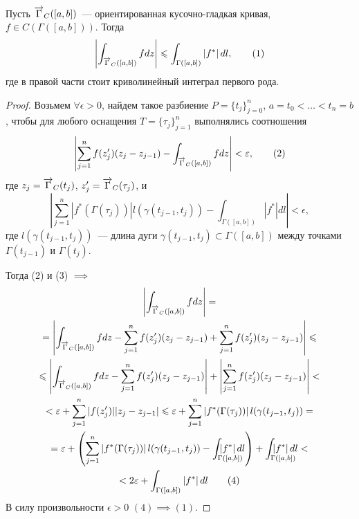 \documentclass[main]{subfiles}
\begin{document}
\begin{property} \label{1:LessThanLength}
    Пусть $\AnClOrCurve_C([a,b])$~--- ориентированная кусочно-гладкая кривая, $f \in C(\Gamma([a,b]))$.
    Тогда
    \[\left| \AnClOrInt[\AnClOrCurve_C ([a,b])] f dz \right| \le \int_{\Gamma([a,b])} \left| f^* \right| dl, \tag{1}\]
    где в правой части стоит криволинейный интеграл первого рода.
\end{property}
\begin{proof}
    Возьмем $\forall \epsilon >0$, найдем такое разбиение $P = \{t_j\}_{j=0}^n$, $a=t_0 < \dotsc < t_n = b$, чтобы для любого оснащения $T = \{\tau_j\}_{j=1}^n$ выполнялись соотношения
    \[\left| \sum_{j=1}^{n} f(z_j') (z_j - z_{j-1}) - \AnClOrInt[\AnClOrCurve_C ([a,b])] f dz \right| < \epsilon, \tag{2}\]
    где $z_j = \AnClOrCurve_C (t_j)$, $z_j' = \AnClOrCurve_C(\tau_j)$, и
    \[\left| \sum_{j=1}^{n} \left| f^*(\Gamma(\tau_j)) \right| l(\gamma(t_{j-1}, t_j)) - \int_{\Gamma([a,b])} \left| f^* \right| dl \right| < \epsilon, \tag{3}\]
    где $l(\gamma(t_{j-1}, t_j))$~--- длина дуги $\gamma(t_{j-1}, t_j) \subset \Gamma([a,b])$ между точками $\Gamma(t_{j-1})$ и $\Gamma(t_j)$.

    Тогда (2) и (3) $\implies$
    \begin{multline*}
        \left| \AnClOrInt[\AnClOrCurve_C ([a,b])] f dz \right| = \\
        = \left| \AnClOrInt[\AnClOrCurve_C ([a,b])] f dz - \sum_{j=1}^{n} f(z_j') (z_j - z_{j-1}) + \sum_{j=1}^{n} f(z_j') (z_j - z_{j-1}) \right| \le \\
        \le \left| \AnClOrInt[\AnClOrCurve_C ([a,b])] f dz - \sum_{j=1}^{n} f(z_j') (z_j - z_{j-1}) \right| + \left| \sum_{j=1}^{n} f(z_j') (z_j - z_{j-1}) \right| < \\
        < \epsilon + \sum_{j=1}^{n} |f(z_j')| |z_j - z_{j-1}| \le \epsilon + \sum_{j=1}^{n} \left| f^*(\Gamma(\tau_j)) \right| l(\gamma(t_{j-1}, t_j)) = \\
        = \epsilon + \left( \sum_{j=1}^{n} \left| f^*(\Gamma(\tau_j)) \right| l(\gamma(t_{j-1}, t_j)) - \int_{\mathrlap{\Gamma([a,b])}} \left| f^* \right| dl \right) + \int_{\mathrlap{\Gamma([a,b])}} \left| f^* \right| dl < \\
        < 2\epsilon + \int_{\Gamma([a,b])} \left| f^* \right| dl \tag{4}
    \end{multline*}
    В силу произвольности $\epsilon >0$ $(4) \implies (1)$.
\end{proof}
\end{document}
